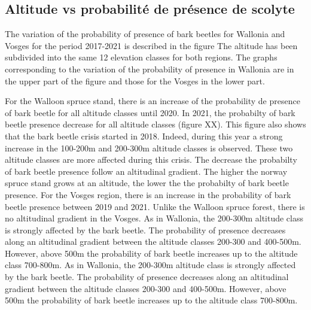 \documentclass[3p,times]{elsarticle}
\begin{document}
\subsection{ Altitude vs probabilité de présence de scolyte}
The variation of the probability of presence of bark beetles for Wallonia and Vosges for the period 2017-2021 is described in the figure 
 The altitude has been subdivided into the same 12 elevation classes for both regions. The graphs corresponding to the variation of the probability of presence in Wallonia are in the upper part of the figure and those for the Vosges in the lower part.


 

For the Walloon spruce stand, there is an increase of the probability de presence of bark beetle for all altitude classes until 2020. In 2021, the probabilty of bark beetle presence decrease for all altitude classes (figure XX). 
This figure also shows that the bark beetle crisis started in 2018. Indeed, during this year a strong increase in the 100-200m and 200-300m altitude classes is observed. These two altitude classes are more affected during this crisis.  
The decrease the probabilty of bark beetle presence follow an altitudinal gradient. The higher the norway spruce stand grows at an altitude, the lower the the probabilty of bark beetle presence.
For the Vosges region, there is an increase in the probability of bark beetle presence between 2019 and 2021. Unlike the Walloon spruce forest, there is no altitudinal gradient in the Vosges.  
As in Wallonia, the 200-300m altitude class is strongly affected by the bark beetle. The probability of presence decreases along an altitudinal gradient between the altitude classes 200-300 and 400-500m. However, above 500m the probability of bark beetle increases up to the altitude class 700-800m. As in Wallonia, the 200-300m altitude class is strongly affected by the bark beetle. The probability of presence decreases along an altitudinal gradient between the altitude classes 200-300 and 400-500m. However, above 500m the probability of bark beetle increases up to the altitude class 700-800m.
\end{document}

